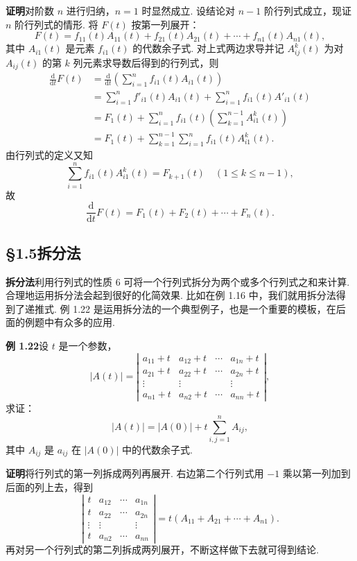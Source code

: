 \documentclass[UTF8, 12pt, fontset=fandol, oneside]{ctexart}
\begin{document}
\noindent\textbf{证明}\quad 对阶数 $n$ 进行归纳，$n=1$ 时显然成立. 设结论对 $n-1$ 阶行列式成立，现证 $n$ 阶行列式的情形. 将 $F(t)$ 按第一列展开：
\[
F(t)=f_{11}(t)A_{11}(t)+f_{21}(t)A_{21}(t)+\cdots+f_{n1}(t)A_{n1}(t),
\]
其中 $A_{i1}(t)$ 是元素 $f_{i1}(t)$ 的代数余子式. 对上式两边求导并记 $A_{ij}^k(t)$ 为对 $A_{ij}(t)$ 的第 $k$ 列元素求导数后得到的行列式，则
\[
\begin{aligned}
\frac{\mathrm{d}}{\mathrm{d}t}F(t)
&=\frac{\mathrm{d}}{\mathrm{d}t}\left(\sum_{i=1}^n f_{i1}(t)A_{i1}(t)\right)\\
&=\sum_{i=1}^n f'_{i1}(t)A_{i1}(t)+\sum_{i=1}^n f_{i1}(t)A'_{i1}(t)\\
&=F_1(t)+\sum_{i=1}^n f_{i1}(t)\left(\sum_{k=1}^{n-1}A_{i1}^k(t)\right)\\
&=F_1(t)+\sum_{k=1}^{n-1}\sum_{i=1}^n f_{i1}(t)A_{i1}^k(t).
\end{aligned}
\]
由行列式的定义又知
\[
\sum_{i=1}^n f_{i1}(t)A_{i1}^k(t)=F_{k+1}(t)\quad(1\le k\le n-1),
\]
故
\[
\frac{\mathrm{d}}{\mathrm{d}t}F(t)=F_1(t)+F_2(t)+\cdots+F_n(t).
\]

\subsection*{§1.5\quad 拆分法}

\noindent\textbf{拆分法}\quad 利用行列式的性质 6 可将一个行列式拆分为两个或多个行列式之和来计算. 合理地运用拆分法会起到很好的化简效果. 比如在例 1.16 中，我们就用拆分法得到了递推式. 例 1.22 是运用拆分法的一个典型例子，也是一个重要的模板，在后面的例题中有众多的应用.

\noindent\textbf{例 1.22}\quad 设 $t$ 是一个参数，
\[
|A(t)|=\left|\begin{array}{cccc}
a_{11}+t & a_{12}+t & \cdots & a_{1n}+t\\
a_{21}+t & a_{22}+t & \cdots & a_{2n}+t\\
\vdots & \vdots &        & \vdots\\
a_{n1}+t & a_{n2}+t & \cdots & a_{nn}+t
\end{array}\right|,
\]
求证：
\[
|A(t)|=|A(0)|+t\sum_{i,j=1}^n A_{ij},
\]
其中 $A_{ij}$ 是 $a_{ij}$ 在 $|A(0)|$ 中的代数余子式.

\noindent\textbf{证明}\quad 将行列式的第一列拆成两列再展开. 右边第二个行列式用 $-1$ 乘以第一列加到后面的列上去，得到
\[
\left|\begin{array}{cccc}
t & a_{12} & \cdots & a_{1n}\\
t & a_{22} & \cdots & a_{2n}\\
\vdots & \vdots &        & \vdots\\
t & a_{n2} & \cdots & a_{nn}
\end{array}\right|
=t(A_{11}+A_{21}+\cdots+A_{n1}).
\]
再对另一个行列式的第二列拆成两列展开，不断这样做下去就可得到结论.
\end{document}
